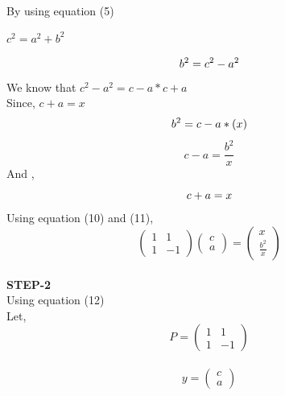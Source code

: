 \documentclass[10pt,a4paper]{report}
\begin{document}
\begin{multicols}{2}
By using equation (5)
\begin{center}
    $ c^2 =a^2 + b^2 $ \vspace{2mm}
\end{center}
\begin{equation}
    b^2 = c^2- a^2 \vspace{2mm}
\end{equation}
We know that $c^2- a^2 =  c-a* c+a$\vspace{2mm}\\
Since, $ c+a=x$
\begin{equation}
  b^2 = c-a*(x) \vspace{2mm}
\end{equation}
\begin{equation}
 c-a = \frac{b^2}{x}
\end{equation}
And ,
\begin{equation}
 c+a = x \vspace{2mm}
\end{equation}
Using equation (10) and (11),
\begin{equation}
  \begin{pmatrix}
1 & 1\\
1 &-1
\end{pmatrix} 
\begin{pmatrix}
c\\
a
\end{pmatrix} = \begin{pmatrix}
x\\
\frac{b^2}{x}
\end{pmatrix} 
\end{equation}\vspace{2mm}\\

\textbf{STEP-2}\vspace{2mm}\\
Using equation (12) \vspace{2mm}\\
 Let,
\begin{equation}
  P =\begin{pmatrix}
1 & 1\\
1 &-1
\end{pmatrix} 
\end{equation} \\ \vspace{2mm}
\begin{equation}
  y =\begin{pmatrix}
c \\
a
\end{pmatrix} 
\end{equation}  \vspace{2mm}


\end{multicols}
\end{document}
